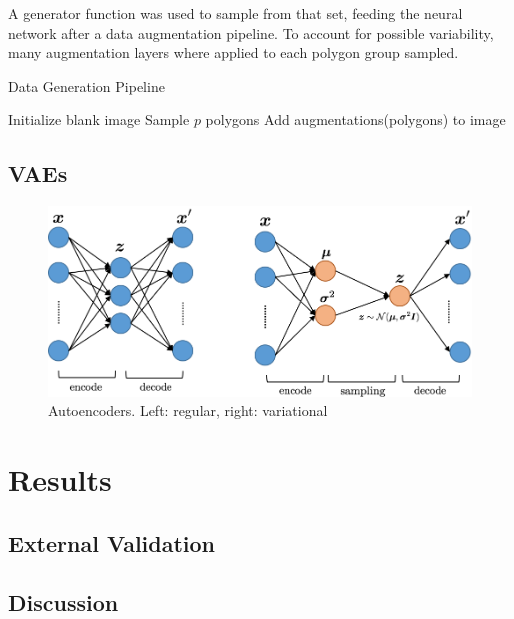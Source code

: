 \documentclass[twocolumn]{article}
\begin{document}
A generator function was used to sample from that set, feeding the neural network after a data augmentation pipeline. To account for possible variability, many augmentation layers where applied to each polygon group sampled.

\begin{algorithm}
\caption{Data Generation Pipeline}
\label{datagen}
    \begin{algorithmic}
    \STATE Initialize blank image
        \STATE Sample $p$ polygons
        \STATE Add augmentations(polygons) to image
    \ENDFOR 
    
\end{algorithmic}
\end{algorithm}


\subsection{VAEs}

\begin{figure} [H]
    \centering
    \includegraphics[scale=0.15]{aes.png}
    \caption{Autoencoders. Left: regular, right: variational}
    \label{fig:aes}
\end{figure}


\section{Results}

\subsection{External Validation}

\subsection{Discussion}
\end{document}
